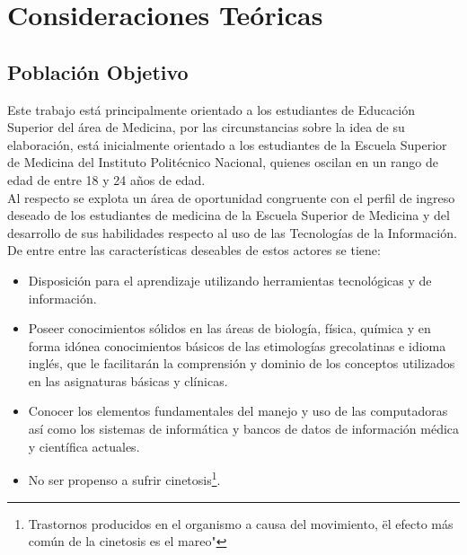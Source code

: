 \chapter{Consideraciones Teóricas}

\section{Poblaci\'on Objetivo}
Este trabajo está principalmente orientado a los estudiantes de Educación Superior del área de Medicina, 
por las circunstancias sobre la idea de su elaboración, está inicialmente orientado a los estudiantes 
de la Escuela Superior de Medicina del Instituto Politécnico Nacional, quienes oscilan en un rango de edad 
de entre 18 y 24 años de edad.\\
Al respecto se explota un área de oportunidad congruente con el perfil de ingreso deseado de los estudiantes 
de medicina de la Escuela Superior de Medicina y del desarrollo de sus habilidades respecto al uso de las 
Tecnologías de la Información.\\
De entre entre las características deseables\cite{web5} de estos actores se tiene:
\begin{itemize}
	\item Disposición para el aprendizaje utilizando herramientas tecnológicas y de información.
	\item Poseer conocimientos sólidos en las áreas de biología, física, química y en forma idónea conocimientos básicos de las etimologías grecolatinas e idioma inglés, que le facilitarán la comprensión y dominio de los conceptos utilizados en las asignaturas básicas y clínicas.
	\item Conocer los elementos fundamentales del manejo y uso de las computadoras así como los sistemas de informática y bancos de datos de información médica y científica actuales.
	\item No ser propenso a sufrir cinetosis\footnote{Trastornos producidos en el organismo a causa del movimiento, \"el efecto más común de la cinetosis es el mareo"}.
\end{itemize}

